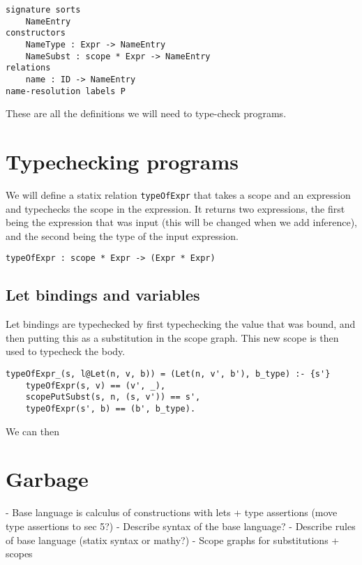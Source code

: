 \begin{lstlisting}
signature sorts
	NameEntry
constructors
	NameType : Expr -> NameEntry
	NameSubst : scope * Expr -> NameEntry
relations
	name : ID -> NameEntry
name-resolution	labels P
\end{lstlisting}

These are all the definitions we will need to type-check programs. 

\section{Typechecking programs}

We will define a statix relation \verb|typeOfExpr| that takes a scope and an expression and typechecks the scope in the expression. It returns two expressions, the first being the expression that was input (this will be changed when we add inference), and the second being the type of the input expression.

\begin{lstlisting}
typeOfExpr : scope * Expr -> (Expr * Expr)
\end{lstlisting}

\subsection{Let bindings and variables}

Let bindings are typechecked by first typechecking the value that was bound, and then putting this as a substitution in the scope graph. This new scope is then used to typecheck the body.

\begin{lstlisting}
typeOfExpr_(s, l@Let(n, v, b)) = (Let(n, v', b'), b_type) :- {s'}
	typeOfExpr(s, v) == (v', _),
	scopePutSubst(s, n, (s, v')) == s',
	typeOfExpr(s', b) == (b', b_type).
\end{lstlisting}

We can then 





\section{Garbage}

- Base language is calculus of constructions with lets + type assertions (move type assertions to sec 5?)
- Describe syntax of the base language?
- Describe rules of base language (statix syntax or mathy?)
- Scope graphs for substitutions + scopes